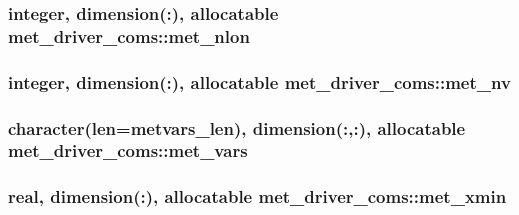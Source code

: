 \subsubsection[{\texorpdfstring{met\+\_\+nlon}{met_nlon}}]{\setlength{\rightskip}{0pt plus 5cm}integer, dimension(\+:), allocatable met\+\_\+driver\+\_\+coms\+::met\+\_\+nlon}\hypertarget{namespacemet__driver__coms_aff461244978aff6f00517c80972b0f23}{}\label{namespacemet__driver__coms_aff461244978aff6f00517c80972b0f23}
\subsubsection[{\texorpdfstring{met\+\_\+nv}{met_nv}}]{\setlength{\rightskip}{0pt plus 5cm}integer, dimension(\+:), allocatable met\+\_\+driver\+\_\+coms\+::met\+\_\+nv}\hypertarget{namespacemet__driver__coms_ad177e131d2e207ace5152559e6a81e50}{}\label{namespacemet__driver__coms_ad177e131d2e207ace5152559e6a81e50}
\subsubsection[{\texorpdfstring{met\+\_\+vars}{met_vars}}]{\setlength{\rightskip}{0pt plus 5cm}character(len={\bf metvars\+\_\+len}), dimension(\+:,\+:), allocatable met\+\_\+driver\+\_\+coms\+::met\+\_\+vars}\hypertarget{namespacemet__driver__coms_ac06aba05a287b0335168be56f48121ab}{}\label{namespacemet__driver__coms_ac06aba05a287b0335168be56f48121ab}
\subsubsection[{\texorpdfstring{met\+\_\+xmin}{met_xmin}}]{\setlength{\rightskip}{0pt plus 5cm}real, dimension(\+:), allocatable met\+\_\+driver\+\_\+coms\+::met\+\_\+xmin}\hypertarget{namespacemet__driver__coms_a8575ea044c0d18d0281c955f3446f606}{}\label{namespacemet__driver__coms_a8575ea044c0d18d0281c955f3446f606}
